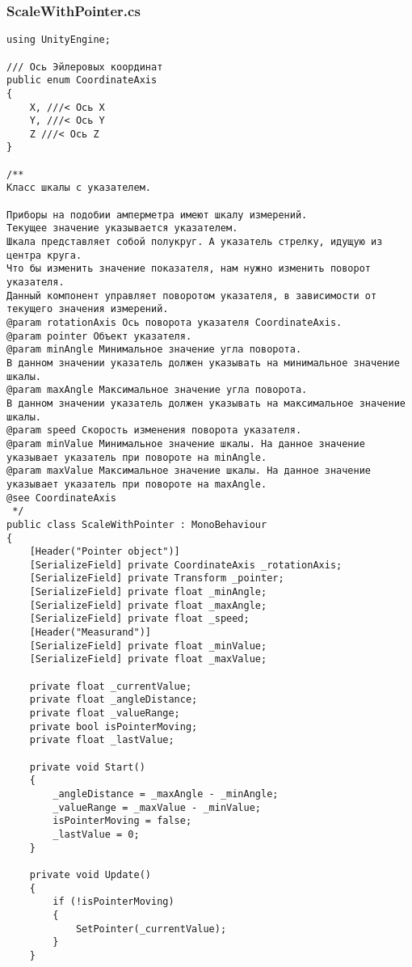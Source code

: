 \subsubsection*{ScaleWithPointer.cs}
\begin{verbatim}
﻿using UnityEngine;

/// Ось Эйлеровых координат
public enum CoordinateAxis
{
    X, ///< Ось X
    Y, ///< Ось Y
    Z ///< Ось Z
}

/**
Класс шкалы с указателем.

Приборы на подобии амперметра имеют шкалу измерений.
Текущее значение указывается указателем. 
Шкала представляет собой полукруг. А указатель стрелку, идущую из центра круга.
Что бы изменить значение показателя, нам нужно изменить поворот указателя.
Данный компонент управляет поворотом указателя, в зависимости от текущего значения измерений.
@param rotationAxis Ось поворота указателя CoordinateAxis.
@param pointer Объект указателя.
@param minAngle Минимальное значение угла поворота. 
В данном значении указатель должен указывать на минимальное значение шкалы.
@param maxAngle Максимальное значение угла поворота. 
В данном значении указатель должен указывать на максимальное значение шкалы.
@param speed Скорость изменения поворота указателя.
@param minValue Минимальное значение шкалы. На данное значение указывает указатель при повороте на minAngle.
@param maxValue Максимальное значение шкалы. На данное значение указывает указатель при повороте на maxAngle.
@see CoordinateAxis
 */
public class ScaleWithPointer : MonoBehaviour
{
    [Header("Pointer object")]
    [SerializeField] private CoordinateAxis _rotationAxis;
    [SerializeField] private Transform _pointer;
    [SerializeField] private float _minAngle;
    [SerializeField] private float _maxAngle;
    [SerializeField] private float _speed;
    [Header("Measurand")]
    [SerializeField] private float _minValue;
    [SerializeField] private float _maxValue;

    private float _currentValue;
    private float _angleDistance;
    private float _valueRange;
    private bool isPointerMoving;
    private float _lastValue;

    private void Start()
    {
        _angleDistance = _maxAngle - _minAngle;
        _valueRange = _maxValue - _minValue;
        isPointerMoving = false;
        _lastValue = 0;
    }

    private void Update()
    {
        if (!isPointerMoving)
        {
            SetPointer(_currentValue);
        }
    }


\end{verbatim}
